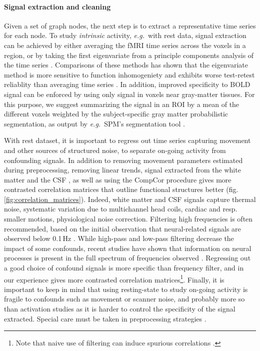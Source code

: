 \documentclass[5p]{elsarticle}
\begin{document}
\paragraph{Signal extraction and cleaning}
Given a set of graph nodes, the next step is to extract a representative time
series for each node.  To study \emph{intrinsic} activity, \emph{e.g.}\ with
rest data, signal extraction can be achieved by either averaging the fMRI time
series across the voxels in a region, or by taking the first eigenvariate from a
principle components analysis of the time series \cite{Friston functional
	localizers}.
Comparisons of these methods has shown that the eigenvariate method is
more sensitive to function inhomogeniety \cite{craddock2011} and exhibits worse
test-retest reliablity than averaging time series \cite{zuo2010}. 
In addition, improved specificity to BOLD signal can be enforced
by using only signal in voxels near gray-matter tissues. For this purpose, we
suggest summarizing the signal in an ROI by a mean of the different voxels
weighted by the subject-specific gray matter probabilistic segmentation, as
output by \emph{e.g.}\ SPM's segmentation tool \cite{ashburner2005}.

With rest dataset, it is important to regress out time series capturing
movement and other sources of structured noise, to separate on-going
activity from confounding signals. In addition to removing movement
parameters estimated during preprocessing, removing linear trends, signal
extracted from the white matter and the CSF \cite{chang2009}, as well as
using the CompCor \cite{behzadi2007} procedure gives more contrasted
correlation matrices that outline functional structures better
(fig.\,\ref{fig:correlation_matrices}). 
Indeed, white matter and CSF signals capture thermal noise, 
systematic variation due to multichannel head coils, cardiac and resp.
smaller motions, physiological noise correction.
Filtering high frequencies is
often recommended, based on the initial observation that neural-related
signals are observed below 0.1\,Hz \cite{cordes2001,biswal1995}. While
high-pass and low-pass filtering decrease the impact of some confounds,
recent studies have shown that information on neural processes is present
in the full spectrum of frequencies observed
\cite{smith2012,vanoort2012}. Regressing out a good choice of confound
signals is more specific than frequency filter, and in our experience
gives more contrasted correlation matrices\footnote{Note that naive use
of filtering can induce spurious correlations \cite{davey2012}.}.
Finally, it is important to keep in mind that using resting-state to
study on-going activity is fragile to confounds such as movement
\cite{vandijk2012,power2011} or scanner noise, and probably more so than
activation studies as it is harder to control the specificity of the
signal extracted. Special care must be taken in preprocessing strategies
\cite{vandijk2010,satterthwaite2012}.
\end{document}
